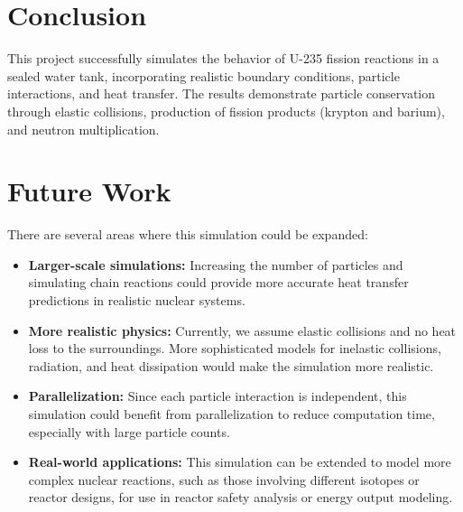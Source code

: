 \documentclass[twocolumn, 11pt]{article}
\begin{document}
\section*{Conclusion}
This project successfully simulates the behavior of U-235 fission reactions in a sealed water tank, incorporating realistic boundary conditions, particle interactions, and heat transfer. The results demonstrate particle conservation through elastic collisions, production of fission products (krypton and barium), and neutron multiplication.

\section*{Future Work}
There are several areas where this simulation could be expanded:

\begin{itemize}
    \item \textbf{Larger-scale simulations:} Increasing the number of particles and simulating chain reactions could provide more accurate heat transfer predictions in realistic nuclear systems.
    
    \item \textbf{More realistic physics:} Currently, we assume elastic collisions and no heat loss to the surroundings. More sophisticated models for inelastic collisions, radiation, and heat dissipation would make the simulation more realistic.
    
    \item \textbf{Parallelization:} Since each particle interaction is independent, this simulation could benefit from parallelization to reduce computation time, especially with large particle counts.
    
    \item \textbf{Real-world applications:} This simulation can be extended to model more complex nuclear reactions, such as those involving different isotopes or reactor designs, for use in reactor safety analysis or energy output modeling.
\end{itemize}
\end{document}
